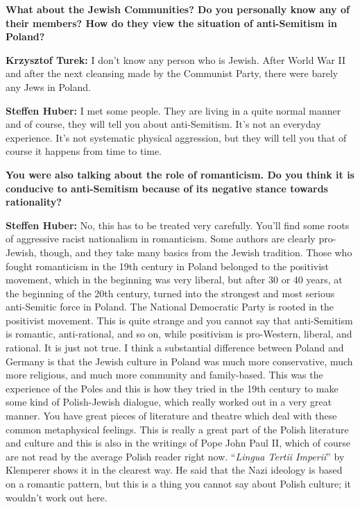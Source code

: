 \textbf{What about the Jewish Communities? Do you personally know any of their members? How do they view the situation of anti-Semitism in Poland?}  

\textbf{Krzysztof Turek:} I don’t know any person who is Jewish. After World War II and after the next cleansing made by the Communist Party, there were barely any Jews in Poland. \par
\textbf{Steffen Huber:} I met some people. They are living in a quite normal manner and of course, they will tell you about anti-Semitism. It’s not an everyday experience. It's not systematic physical aggression, but they will tell you that of course it happens from time to time. 

\textbf{You were also talking about the role of romanticism. Do you think it is conducive to anti-Semitism because of its negative stance towards rationality?} 

\textbf{Steffen Huber:} No, this has to be treated very carefully. You’ll find some roots of aggressive racist nationalism in romanticism. Some authors are clearly pro-Jewish, though, and they take many basics from the Jewish tradition. Those who fought romanticism in the 19th century in Poland belonged to the positivist movement, which in the beginning was very liberal, but after 30 or 40 years, at the beginning of the 20th century, turned into the strongest and most serious anti-Semitic force in Poland. The National Democratic Party is rooted in the positivist movement. This is quite strange and you cannot say that anti-Semitism is romantic, anti-rational, and so on, while positivism is pro-Western, liberal, and rational. It is just not true. I think a substantial difference between Poland and Germany is that the Jewish culture in Poland was much more conservative, much more religious, and much more community and family-based. This was the experience of the Poles and this is how they tried in the 19th century to make some kind of Polish-Jewish dialogue, which really worked out in a very great manner. You have great pieces of literature and theatre which deal with these common metaphysical feelings. This is really a great part of the Polish literature and culture and this is also in the writings of Pope John Paul II, which of course are not read by the average Polish reader right now. ``\textit{Lingua Tertii Imperii}'' by Klemperer shows it in the clearest way. He said that the Nazi ideology is based on a romantic pattern, but this is a thing you cannot say about Polish culture; it wouldn't work out here.
